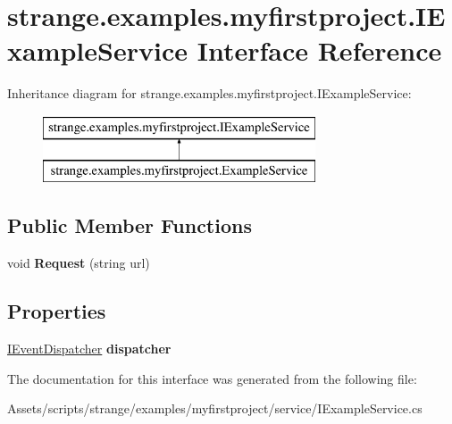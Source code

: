 \hypertarget{interfacestrange_1_1examples_1_1myfirstproject_1_1_i_example_service}{\section{strange.\-examples.\-myfirstproject.\-I\-Example\-Service Interface Reference}
\label{interfacestrange_1_1examples_1_1myfirstproject_1_1_i_example_service}
}
Inheritance diagram for strange.\-examples.\-myfirstproject.\-I\-Example\-Service\-:\begin{figure}[H]
\begin{center}
\leavevmode
\includegraphics[height=2.000000cm]{interfacestrange_1_1examples_1_1myfirstproject_1_1_i_example_service}
\end{center}
\end{figure}
\subsection*{Public Member Functions}
\begin{DoxyCompactItemize}
\item 
\hypertarget{interfacestrange_1_1examples_1_1myfirstproject_1_1_i_example_service_ad875773c964e626eed3ef119ace4739b}{void {\bfseries Request} (string url)}\label{interfacestrange_1_1examples_1_1myfirstproject_1_1_i_example_service_ad875773c964e626eed3ef119ace4739b}

\end{DoxyCompactItemize}
\subsection*{Properties}
\begin{DoxyCompactItemize}
\item 
\hypertarget{interfacestrange_1_1examples_1_1myfirstproject_1_1_i_example_service_a12e6d8df78d3d58cbeb4b1e61d6e87de}{\hyperlink{interfacestrange_1_1extensions_1_1dispatcher_1_1eventdispatcher_1_1api_1_1_i_event_dispatcher}{I\-Event\-Dispatcher} {\bfseries dispatcher}}\label{interfacestrange_1_1examples_1_1myfirstproject_1_1_i_example_service_a12e6d8df78d3d58cbeb4b1e61d6e87de}

\end{DoxyCompactItemize}


The documentation for this interface was generated from the following file\-:\begin{DoxyCompactItemize}
\item 
Assets/scripts/strange/examples/myfirstproject/service/I\-Example\-Service.\-cs\end{DoxyCompactItemize}
